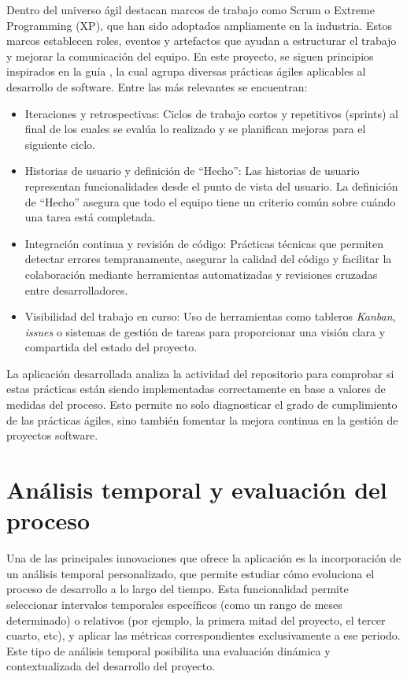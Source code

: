 Dentro del universo ágil destacan marcos de trabajo como Scrum o Extreme Programming (XP), que han sido adoptados ampliamente en la industria. Estos marcos establecen roles, eventos y artefactos que ayudan a estructurar el trabajo y mejorar la comunicación del equipo. En este proyecto, se siguen principios inspirados en la guía \cite{agileSubwayMap}, la cual agrupa diversas prácticas ágiles aplicables al desarrollo de software. Entre las más relevantes se encuentran:

\begin{itemize}
\item Iteraciones y retrospectivas: Ciclos de trabajo cortos y repetitivos (sprints) al final de los cuales se evalúa lo realizado y se planifican mejoras para el siguiente ciclo.
\item Historias de usuario y definición de “Hecho”: Las historias de usuario representan funcionalidades desde el punto de vista del usuario. La definición de “Hecho” asegura que todo el equipo tiene un criterio común sobre cuándo una tarea está completada.
\item Integración continua y revisión de código: Prácticas técnicas que permiten detectar errores tempranamente, asegurar la calidad del código y facilitar la colaboración mediante herramientas automatizadas y revisiones cruzadas entre desarrolladores.
\item Visibilidad del trabajo en curso: Uso de herramientas como tableros \textit{Kanban}, \textit{issues} o sistemas de gestión de tareas para proporcionar una visión clara y compartida del estado del proyecto.
\end{itemize}

La aplicación desarrollada analiza la actividad del repositorio para comprobar si estas prácticas están siendo implementadas correctamente en base a valores de medidas del proceso. Esto permite no solo diagnosticar el grado de cumplimiento de las prácticas ágiles, sino también fomentar la mejora continua en la gestión de proyectos software.

\section{Análisis temporal y evaluación del proceso}
Una de las principales innovaciones que ofrece la aplicación es la incorporación de un análisis temporal personalizado, que permite estudiar cómo evoluciona el proceso de desarrollo a lo largo del tiempo. Esta funcionalidad permite seleccionar intervalos temporales específicos (como un rango de meses determinado) o relativos (por ejemplo, la primera mitad del proyecto, el tercer cuarto, etc), y aplicar las métricas correspondientes exclusivamente a ese periodo. Este tipo de análisis temporal posibilita una evaluación dinámica y contextualizada del desarrollo del proyecto.

